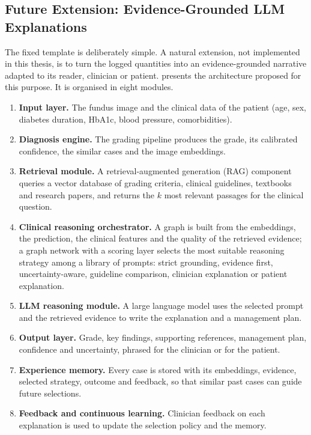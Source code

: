 \subsection{Future Extension: Evidence-Grounded LLM Explanations}
\label{sec:llm}

The fixed template is deliberately simple. A natural extension, not implemented in this
thesis, is to turn the logged quantities into an evidence-grounded narrative adapted to
its reader, clinician or patient.  presents the architecture proposed for
this purpose. It is organised in eight modules.



\begin{enumerate}[leftmargin=1.6em,itemsep=2pt]
\item \textbf{Input layer.} The fundus image and the clinical data of the patient (age,
sex, diabetes duration, HbA1c, blood pressure, comorbidities).
\item \textbf{Diagnosis engine.} The grading pipeline produces the grade, its calibrated
confidence, the similar cases and the image embeddings.
\item \textbf{Retrieval module.} A retrieval-augmented generation (RAG) component queries a
vector database of grading criteria, clinical guidelines, textbooks and research papers,
and returns the $k$ most relevant passages for the clinical question.
\item \textbf{Clinical reasoning orchestrator.} A graph is built from the embeddings, the
prediction, the clinical features and the quality of the retrieved evidence; a graph
network with a scoring layer selects the most suitable reasoning strategy among a
library of prompts: strict grounding, evidence first, uncertainty-aware, guideline
comparison, clinician explanation or patient explanation.
\item \textbf{LLM reasoning module.} A large language model uses the selected prompt and
the retrieved evidence to write the explanation and a management plan.
\item \textbf{Output layer.} Grade, key findings, supporting references, management plan,
confidence and uncertainty, phrased for the clinician or for the patient.
\item \textbf{Experience memory.} Every case is stored with its embeddings, evidence,
selected strategy, outcome and feedback, so that similar past cases can guide future
selections.
\item \textbf{Feedback and continuous learning.} Clinician feedback on each explanation is
used to update the selection policy and the memory.
\end{enumerate}

